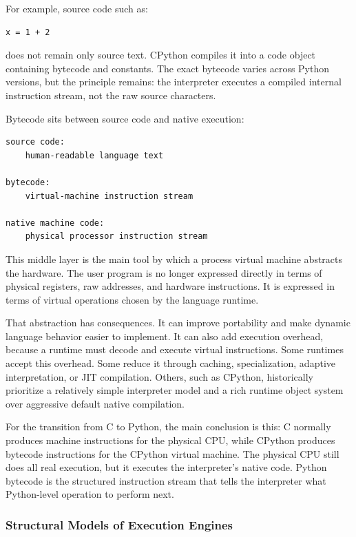 \documentclass[a4paper,twoside]{report}
\begin{document}
For example, source code such as:

\begin{verbatim}
x = 1 + 2
\end{verbatim}

does not remain only source text. CPython compiles it into a code object containing bytecode and constants. The exact bytecode varies across Python versions, but the principle remains: the interpreter executes a compiled internal instruction stream, not the raw source characters.

Bytecode sits between source code and native execution:

\begin{verbatim}
source code:
    human-readable language text

bytecode:
    virtual-machine instruction stream

native machine code:
    physical processor instruction stream
\end{verbatim}

This middle layer is the main tool by which a process virtual machine abstracts the hardware. The user program is no longer expressed directly in terms of physical registers, raw addresses, and hardware instructions. It is expressed in terms of virtual operations chosen by the language runtime.

That abstraction has consequences. It can improve portability and make dynamic language behavior easier to implement. It can also add execution overhead, because a runtime must decode and execute virtual instructions. Some runtimes accept this overhead. Some reduce it through caching, specialization, adaptive interpretation, or JIT compilation. Others, such as CPython, historically prioritize a relatively simple interpreter model and a rich runtime object system over aggressive default native compilation.

For the transition from C to Python, the main conclusion is this: C normally produces machine instructions for the physical CPU, while CPython produces bytecode instructions for the CPython virtual machine. The physical CPU still does all real execution, but it executes the interpreter's native code. Python bytecode is the structured instruction stream that tells the interpreter what Python-level operation to perform next.



\subsubsection{Structural Models of Execution Engines}
\end{document}
